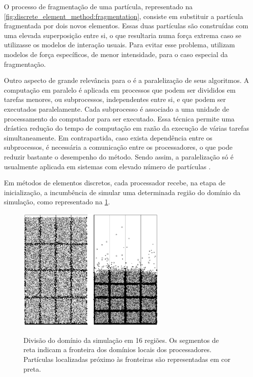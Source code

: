 O processo de fragmentação de uma partícula, representado na \cref{fig:discrete_element_method:fragmentation}, consiste em substituir a partícula fragmentada por dois novos elementos. Essas duas partículas são construídas com uma elevada superposição entre si, o que resultaria numa força extrema caso se utilizasse os modelos de interação usuais. Para evitar esse problema, utilizam modelos de força específicos, de menor intensidade, para o caso especial da fragmentação.

Outro aspecto de grande relevância para o \DEM{} é a paralelização de seus algoritmos. A computação em paralelo é aplicada em processos que podem ser divididos em tarefas menores, ou subprocessos, independentes entre si, e que podem ser executados paralelamente. Cada subprocesso é associado a uma unidade de processamento do computador para ser executado. Essa técnica permite uma drástica redução do tempo de computação em razão da execução de várias tarefas simultaneamente. Em contrapartida, caso exista dependência entre os subprocessos, é necessária a comunicação entre os processadores, o que pode reduzir bastante o desempenho do método. Sendo assim, a paralelização só é usualmente aplicada em sistemas com elevado número de partículas \cite[p. 128]{bib:computational_granular_dynamics}.

Em métodos de elementos discretos, cada processador recebe, na etapa de inicialização, a incumbência de simular uma determinada região do domínio da simulação, como representado na \cref{fig:discrete_element_method:parallelization}.

\begin{figure}[h]
	\caption{Divisão do domínio da simulação em 16 regiões. Os segmentos de reta indicam a fronteira dos domínios locais dos processadores. Partículas localizadas próximo às fronteiras são representadas em cor preta.}
	\centering
		\includegraphics[width=0.65\textwidth]{images/discrete_element_method/parallelization/domain_division}
	\label{fig:discrete_element_method:parallelization}
\end{figure}

